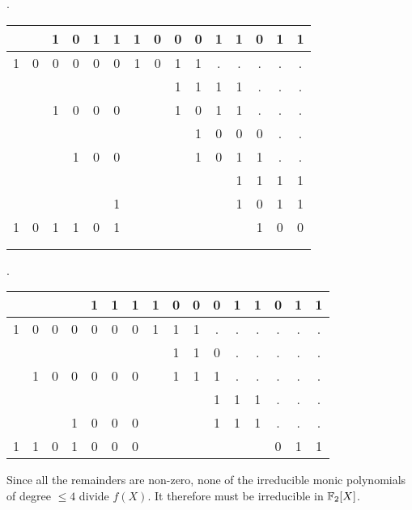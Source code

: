 \begin{problem}
\begin{enumerate}
\begin{Answer}
\begin{multicols}{3}
\noindent
{}.
\newline
\color{zaffre}
\begin{tabular}{c@{\,}c@{\,}c@{\,}c@{\,}c@{\,}c@{\,}|c@{\,}c@{\,}c@{\,}c@{\,}c@{\,}c@{\,}c@{\,}c@{\,}c@{\,}}
  &   & 1 & 0 & 1 & 1     & 1 & 0 & 0 & 0 & 1 & 1 & 0 & 1 & 1\\
\hline{}
1 & 0 & 0 & 0 & 0 & 0     & 1 & 0 & 1 & 1 &.  &.  &.  &.  &. \\
  &   &   &   &   &       &   &   & 1 & 1 & 1 & 1 &.  &.  &. \\
  &   & 1 & 0 & 0 & 0     &   &   & 1 & 0 & 1 & 1 &.  &.  &. \\
  &   &   &   &   &       &   &   &   & 1 & 0 & 0 & 0 &.  &. \\
  &   &   & 1 & 0 & 0     &   &   &   & 1 & 0 & 1 & 1 &.  &. \\
  &   &   &   &   &       &   &   &   &   &   & 1 & 1 & 1 & 1\\
  &   &   &   &   & 1     &   &   &   &   &   & 1 & 0 & 1 & 1\\
  \hline{}
  1 & 0 & 1 & 1 & 0 & 1     &   &   &   &   &   &   & 1 & 0 & 0\\
\\
\\
\end{tabular}
\color{black}

\noindent
{}.
\newline
\color{zaffre}
\begin{tabular}{c@{\,}c@{\,}c@{\,}c@{\,}c@{\,}c@{\,}c@{\,}|c@{\,}c@{\,}c@{\,}c@{\,}c@{\,}c@{\,}c@{\,}c@{\,}c@{\,}}
  &   &   &   & 1 & 1 & 1     & 1 & 0 & 0 & 0 & 1 & 1 & 0 & 1 & 1\\
\hline{}
1 & 0 & 0 & 0 & 0 & 0 & 0     & 1 & 1 & 1 &.  &.  &.  &.  &.  &. \\
  &   &   &   &   &   &       &   & 1 & 1 & 0 &.  &.  &.  &.  &. \\
  & 1 & 0 & 0 & 0 & 0 & 0     &   & 1 & 1 & 1 &.  &.  &.  &.  &. \\
  &   &   &   &   &   &       &   &   &   & 1 & 1 & 1 &.  &.  &. \\
  &   &   & 1 & 0 & 0 & 0     &   &   &   & 1 & 1 & 1 &.  &.  &. \\
  \hline{}
1 & 1 & 0 & 1 & 0 & 0 & 0     &   &   &   &   &   &   & 0 & 1 & 1\\
\end{tabular}
\color{black}

\end{multicols}

\noindent
Since all the remainders are non-zero,
none of the irreducible monic polynomials of degree $\leq 4$ divide
$f(X)$. It therefore must be irreducible in $\mathbb{F}_2[X]$.
\end{Answer}

\end{enumerate}
\end{problem}
